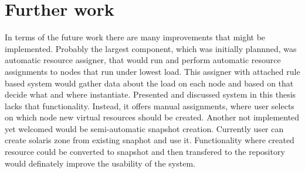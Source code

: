 \documentclass[11pt]{book}
\begin{document}
		

    \section{Further work}
		\label{sub:sum:further}
	
      In terms of the future work there are many improvements that might be implemented. Probably the largest component,
      which was initially plannned, was automatic resource assigner, that would run and perform automatic resource
      assignments to nodes that run under lowest load. This assigner with attached rule based system would gather data
      about the load on each node and based on that decide what and where instantiate. Presented and discussed system in
      this thesis lacks that functionality. Instead, it offers manual assignments, where user selects on which node new
      virtual resources should be created. Another not implemented yet welcomed would be semi-automatic snapshot creation. 
      Currently user can create solaris zone from existing snaphot and use it. Functionality where created resource could be 
      converted to snapshot and then transfered to the repository would definately improve the usability of the system.


  
  
\end{document}
